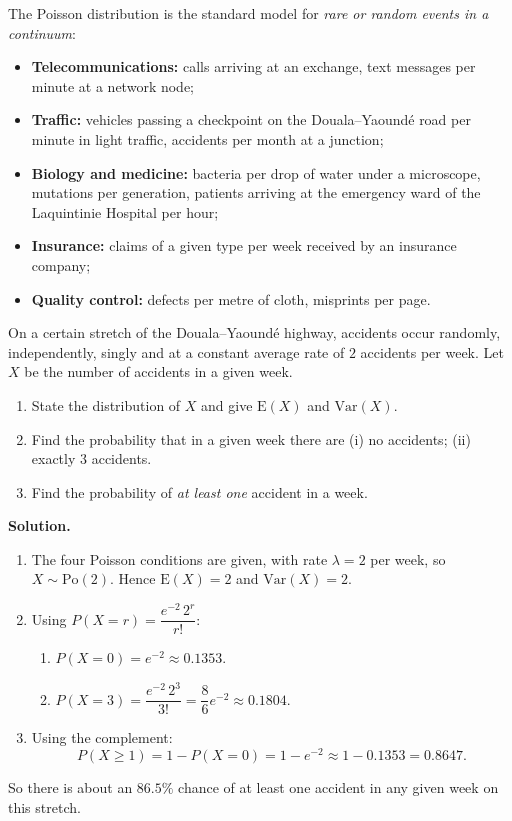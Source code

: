 \documentclass[11pt]{article}
\begin{document}
The Poisson distribution is the standard model for \emph{rare or random events in a continuum}:
\begin{itemize}
\item \textbf{Telecommunications:} calls arriving at an exchange, text messages per minute at a network node;
\item \textbf{Traffic:} vehicles passing a checkpoint on the Douala--Yaoundé road per minute in light traffic, accidents per month at a junction;
\item \textbf{Biology and medicine:} bacteria per drop of water under a microscope, mutations per generation, patients arriving at the emergency ward of the Laquintinie Hospital per hour;
\item \textbf{Insurance:} claims of a given type per week received by an insurance company;
\item \textbf{Quality control:} defects per metre of cloth, misprints per page.
\end{itemize}

\begin{exoresolu}
On a certain stretch of the Douala--Yaoundé highway, accidents occur randomly, independently, singly and at a constant average rate of $2$ accidents per week. Let $X$ be the number of accidents in a given week.
\begin{enumerate}
\item State the distribution of $X$ and give $\mathrm{E}(X)$ and $\mathrm{Var}(X)$.
\item Find the probability that in a given week there are (i) no accidents; (ii) exactly $3$ accidents.
\item Find the probability of \emph{at least one} accident in a week.
\end{enumerate}
\tcblower
\textbf{Solution.}
\begin{enumerate}
\item The four Poisson conditions are given, with rate $\lambda = 2$ per week, so $X \sim \mathrm{Po}(2)$. Hence $\mathrm{E}(X) = 2$ and $\mathrm{Var}(X) = 2$.
\item Using $P(X = r) = \dfrac{e^{-2}\,2^{r}}{r!}$:
\begin{enumerate}
\item[(i)] $P(X = 0) = e^{-2} \approx 0.1353$.
\item[(ii)] $P(X = 3) = \dfrac{e^{-2}\,2^{3}}{3!} = \dfrac{8}{6}e^{-2} \approx 0.1804$.
\end{enumerate}
\item Using the complement:
\[ P(X \geq 1) = 1 - P(X = 0) = 1 - e^{-2} \approx 1 - 0.1353 = 0.8647. \]
\end{enumerate}
So there is about an $86.5\%$ chance of at least one accident in any given week on this stretch.
\end{exoresolu}
\end{document}
